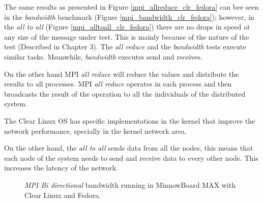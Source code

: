 The same results as presented in Figure \ref{mpi_allreduce_clr_fedora} can bee
seen in the \textit{bandwidth} benchmark (Figure
\ref{mpi_bandwidth_clr_fedora}); however, in the \textit{all to all} (Figure
\ref{mpi_alltoall_clr_fedora}) there are no drops in speed at any size of the
message under test.  This is mainly because of the nature of the test
(Described in Chapter 3). The \textit{all reduce} and the \textit{bandwidth}
tests execute similar tasks. Meanwhile, \textit{bandwidth} executes send and
receives.

On the other hand MPI \textit{all reduce} will reduce the values and distribute
the results to all processes. MPI \textit{all reduce} operates in each process
and then broadcasts the result of the operation to all the individuals of the
distributed system.

The Clear Linux OS has specific implementations in the kernel that improve the
network performance, specially in the kernel network area.

On the other hand, the \textit{all to all} sends data from all the nodes, this
means that each node of the system needs to send and receive data to every
other node. This increases the latency of the network.

\begin{figure}[H]
\begin{center}
\end{center}
\caption{\textit{MPI Bi directional} bandwidth running in  MinnowBoard MAX with Clear Linux
and Fedora.}
\label{mpi_bibw_clr_fedora}
\end{figure}


